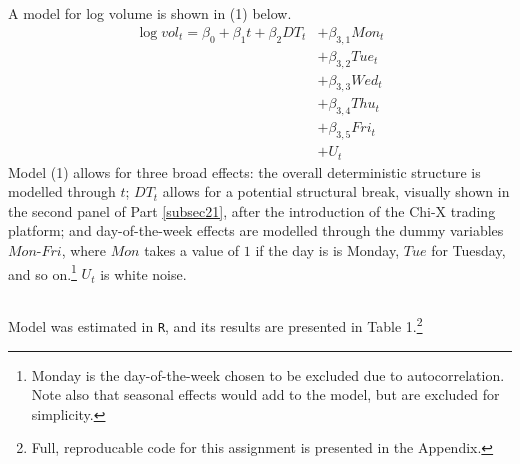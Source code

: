 \documentclass{article}\usepackage[]{graphicx}\usepackage[]{color}
\begin{document}
\subsection{}\label{subsec22}
A model for log volume is shown in (1) below.
    \begin{align*} \label{eq22} 
    \log{vol_t}  = \beta_{0} + \beta_{1} t + \beta_{2} DT_{t} &+ \beta_{3,1} Mon_{t} \tag*{(1)} \\ 
                                                              &+ \beta_{3,2} Tue_{t} \\
                                                              &+ \beta_{3,3} Wed_{t} \\
                                                              &+ \beta_{3,4} Thu_{t} \\
                                                              &+ \beta_{3,5} Fri_{t} \\
                                                      &+ U_{t}
    \end{align*}
  Model (1) allows for three broad effects: the overall deterministic structure is modelled through $t$; $DT_{t}$ allows for a potential structural break, visually shown in the second panel of Part \ref{subsec21}, after the introduction of the Chi-X trading platform; and day-of-the-week effects are modelled through the dummy variables $Mon$-$Fri$, where $Mon$ takes a value of $1$ if the day is is Monday, $Tue$ for Tuesday, and so on.\footnote{Monday is the day-of-the-week chosen to be excluded due to autocorrelation. Note also that seasonal effects would add to the model, but are excluded for simplicity.} $U_{t}$ is white noise.





\newpage
\subsection{} \label{subsec23} %

  Model \label{eq22} was estimated in \texttt{R}, and its results are presented in Table 1.\footnote{Full, reproducable code for this assignment is presented in the Appendix.}
\end{document}

